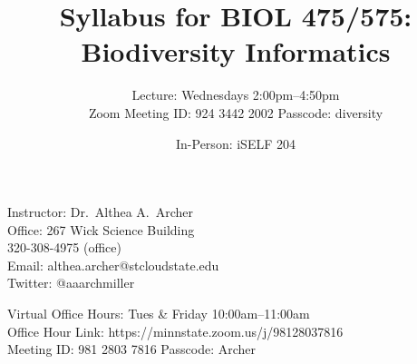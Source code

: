 \documentclass{tufte-handout}
\title{Syllabus for BIOL 475/575: Biodiversity Informatics}										%
\author{Lecture: Wednesdays 2:00pm--4:50pm \\
\color{gray} Zoom Meeting ID: 924 3442 2002
Passcode: diversity \color{black}}								%
\date{In-Person: iSELF 204}
\begin{document}
\maketitle

Instructor: Dr.~Althea A.~Archer\\
Office: 267 Wick Science Building\\
320-308-4975 (office) \\
Email: althea.archer@stcloudstate.edu\\
Twitter: @aaarchmiller

\color{gray} Virtual Office Hours: Tues \& Friday 10:00am--11:00am \\
Office Hour Link: https://minnstate.zoom.us/j/98128037816\\
Meeting ID: 981 2803 7816 Passcode: Archer \color{black}
\end{document}
